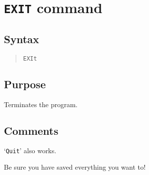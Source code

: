 \section{{\tt EXIT} command}
\subsection{Syntax}
\begin{verse}
{\tt EXIt}
\end{verse}
\subsection{Purpose}

Terminates the program.
\subsection{Comments}

`{\tt Quit}' also works.

Be sure you have saved everything you want to!
